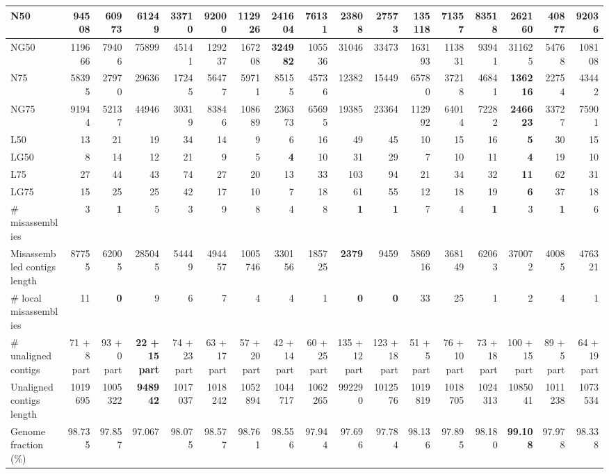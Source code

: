 \documentclass[12pt,a4paper]{article}
\begin{document}
\begin{table}[ht]
\begin{center}
\begin{tabular}{|l*{16}{|r}|}
N50 & 94508 & 60973 & 61249 & 33710 & 92000 & 112926 & 241604 & 76131 & 23808 & 27573 & 135118 & 71357 & 83518 & {\bf 262160} & 40877 & 92036 \\ \hline
NG50 & 119666 & 79406 & 75899 & 45141 & 129237 & 167208 & {\bf 324982} & 105536 & 31046 & 33473 & 163193 & 113831 & 93941 & 311625 & 54768 & 108108 \\ \hline
N75 & 58395 & 27970 & 29636 & 17245 & 56477 & 59711 & 85155 & 45736 & 12382 & 15449 & 65780 & 37218 & 46841 & {\bf 136216} & 22754 & 43442 \\ \hline
NG75 & 91944 & 52137 & 44946 & 30319 & 83846 & 108689 & 236373 & 65695 & 19385 & 23364 & 112992 & 64014 & 72282 & {\bf 246623} & 33727 & 75901 \\ \hline
L50 & 13 & 21 & 19 & 34 & 14 & 9 & 6 & 16 & 49 & 45 & 10 & 15 & 16 & {\bf 5} & 30 & 15 \\ \hline
LG50 & 8 & 14 & 12 & 21 & 9 & 5 & {\bf 4} & 10 & 31 & 29 & 7 & 10 & 11 & {\bf 4} & 19 & 10 \\ \hline
L75 & 27 & 44 & 43 & 74 & 27 & 20 & 13 & 33 & 103 & 94 & 21 & 34 & 32 & {\bf 11} & 62 & 31 \\ \hline
LG75 & 15 & 25 & 25 & 42 & 17 & 10 & 7 & 18 & 61 & 55 & 12 & 18 & 19 & {\bf 6} & 37 & 18 \\ \hline
\# misassemblies & 3 & {\bf 1} & 5 & 3 & 9 & 8 & 4 & 8 & {\bf 1} & {\bf 1} & 7 & 4 & {\bf 1} & 3 & {\bf 1} & 6 \\ \hline
Misassembled contigs length & 87755 & 62005 & 285045 & 54449 & 494457 & 1005746 & 330156 & 185725 & {\bf 2379} & 9459 & 586916 & 368149 & 62063 & 370072 & 40085 & 476321 \\ \hline
\# local misassemblies & 11 & {\bf 0} & 9 & 6 & 7 & 4 & 4 & 1 & {\bf 0} & {\bf 0} & 33 & 25 & 1 & 2 & 4 & 1 \\ \hline
\# unaligned contigs & 71 + 8 part & 93 + 0 part & {\bf 22 + 15 part} & 74 + 23 part & 63 + 17 part & 57 + 20 part & 42 + 14 part & 60 + 25 part & 135 + 12 part & 123 + 18 part & 51 + 5 part & 76 + 10 part & 73 + 18 part & 100 + 15 part & 89 + 5 part & 64 + 19 part \\ \hline
Unaligned contigs length & 1019695 & 1005322 & {\bf 948942} & 1017037 & 1018242 & 1052894 & 1044717 & 1062265 & 992290 & 1012576 & 1019819 & 1018705 & 1024313 & 1085041 & 1011238 & 1073534 \\ \hline
Genome fraction (\%) & 98.735 & 97.857 & 97.067 & 98.075 & 98.577 & 98.761 & 98.556 & 97.944 & 97.696 & 97.784 & 98.136 & 97.895 & 98.180 & {\bf 99.108} & 97.978 & 98.338 \\ \hline

\end{tabular}
\end{center}
\end{table}
\end{document}
